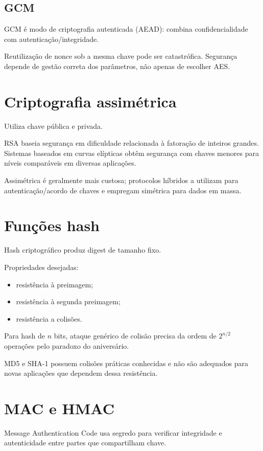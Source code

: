 \subsection{GCM}

GCM é modo de criptografia autenticada (AEAD): combina confidencialidade com autenticação/integridade.

Reutilização de nonce sob a mesma chave pode ser catastrófica. Segurança depende de gestão correta dos parâmetros, não apenas de escolher AES.

\section{Criptografia assimétrica}

Utiliza chave pública e privada.

RSA baseia segurança em dificuldade relacionada à fatoração de inteiros grandes. Sistemas baseados em curvas elípticas obtêm segurança com chaves menores para níveis comparáveis em diversas aplicações.

Assimétrica é geralmente mais custosa; protocolos híbridos a utilizam para autenticação/acordo de chaves e empregam simétrica para dados em massa.

\section{Funções hash}

Hash criptográfico produz digest de tamanho fixo.

Propriedades desejadas:
\begin{itemize}
\item resistência à preimagem;
\item resistência à segunda preimagem;
\item resistência a colisões.
\end{itemize}

Para hash de $n$ bits, ataque genérico de colisão precisa da ordem de $2^{n/2}$ operações pelo paradoxo do aniversário.

MD5 e SHA-1 possuem colisões práticas conhecidas e não são adequados para novas aplicações que dependem dessa resistência.

\section{MAC e HMAC}

Message Authentication Code usa segredo para verificar integridade e autenticidade entre partes que compartilham chave.

